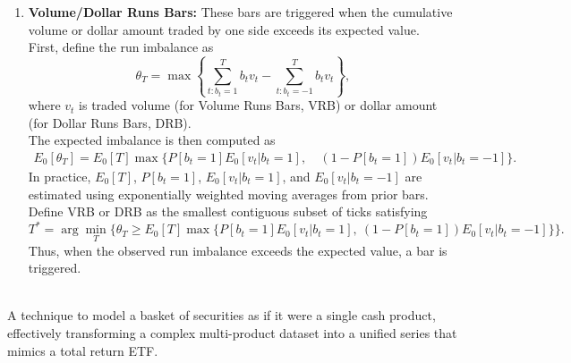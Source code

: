 \begin{remark}
\begin{enumerate}[label=\roman*.]
\item \textbf{Volume/Dollar Runs Bars:} These bars are triggered when the cumulative volume or dollar amount traded by one side exceeds its expected value.\\
First, define the run imbalance as
\[ \theta_T = \max \left\{ \sum_{t: b_t = 1}^{T} b_t v_t - \sum_{t: b_t = -1}^{T} b_t v_t \right\}, \]
where $v_t$ is traded volume (for Volume Runs Bars, VRB) or dollar amount (for Dollar Runs Bars, DRB).\\
The expected imbalance is then computed as
\begin{align}
E_0[\theta_T] = E_0[T] \max \Big\{ P[b_t = 1]E_0[v_t \vert b_t = 1],\ & (1 - P[b_t = 1])E_0[v_t \vert b_t = -1] \Big\}. \nonumber
\end{align}
In practice, $E_0[T]$, $P[b_t = 1]$, $E_0[v_t \vert b_t = 1]$, and $E_0[v_t \vert b_t = -1]$ are estimated using exponentially weighted moving averages from prior bars. Define VRB or DRB as the smallest contiguous subset of ticks satisfying
\[ T^* = \arg \min_T \Big\{ \theta_T \geq E_0[T] \max \Big\{ P[b_t = 1]E_0[v_t \vert b_t = 1],\ (1 - P[b_t = 1])E_0[v_t \vert b_t = -1] \Big\} \Big\}. \]
Thus, when the observed run imbalance exceeds the expected value, a bar is triggered.
\end{enumerate}
\end{remark}

\begin{definition} \\
A technique to model a basket of securities as if it were a single cash product, effectively transforming a complex multi-product dataset into a unified series that mimics a total return ETF.
\end{definition}

